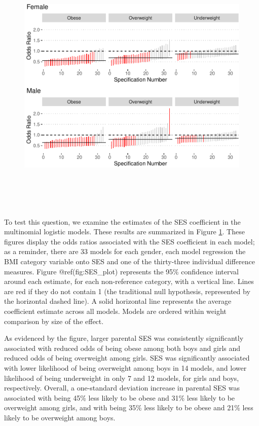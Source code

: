 \documentclass[man]{apa6}
\begin{document}
\begin{figure}
\includegraphics[height=5in]{bmi_personality_files/figure-latex/SESplot-1} \caption{ }\label{fig:SESplot}
\end{figure}

To test this question, we examine the estimates of the SES coefficient in the multinomial logistic models. These results are summarized in Figure \ref{fig:SESplot}. These figures display the odds ratios associated with the SES coefficient in each model; as a reminder, there are 33 models for each gender, each model regression the BMI category variable onto SES and one of the thirty-three individual difference measures. Figure @ref(fig:SES\_plot) represents the 95\% confidence interval around each estimate, for each non-reference category, with a vertical line. Lines are red if they do not contain 1 (the traditional null hypothesis, represented by the horizontal dashed line). A solid horizontal line represents the average coefficient estimate across all models. Models are ordered within weight comparison by size of the effect.

As evidenced by the figure, larger parental SES was consistently significantly associated with reduced odds of being obese among both boys and girls and reduced odds of being overweight among girls. SES was significantly associated with lower likelihood of being overweight among boys in 14 models, and lower likelihood of being underweight in only 7 and 12 models, for girls and boys, respectively. Overall, a one-standard deviation increase in parental SES was associated with being 45\% less likely to be obese and 31\% less likely to be overweight among girls, and with being 35\% less likely to be obese and 21\% less likely to be overweight among boys.
\end{document}
